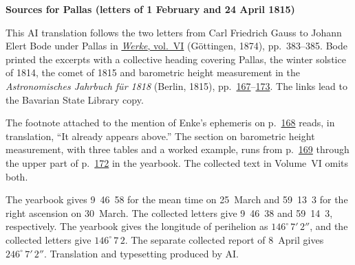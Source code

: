 \clearpage\thispagestyle{empty}
\begin{center}\textbf{Sources for Pallas (letters of 1 February and 24 April 1815)}\end{center}
\noindent This AI translation follows the two letters from Carl Friedrich Gauss to Johann Elert Bode under Pallas in \href{https://gdz.sub.uni-goettingen.de/id/PPN236007467}{\textit{Werke}, vol.~VI} (Göttingen, 1874), pp.~383--385. Bode printed the excerpts with a collective heading covering Pallas, the winter solstice of 1814, the comet of 1815 and barometric height measurement in the \textit{Astronomisches Jahrbuch für 1818} (Berlin, 1815), pp.~\href{https://api.digitale-sammlungen.de/iiif/image/v2/bsb10538347_00175/full/1600,/0/default.jpg}{167}--\href{https://api.digitale-sammlungen.de/iiif/image/v2/bsb10538347_00181/full/1600,/0/default.jpg}{173}. The links lead to the Bavarian State Library copy.
\par\smallskip\noindent The footnote attached to the mention of Enke’s ephemeris on p.~\href{https://api.digitale-sammlungen.de/iiif/image/v2/bsb10538347_00176/full/1600,/0/default.jpg}{168} reads, in translation, “It already appears above.” The section on barometric height measurement, with three tables and a worked example, runs from p.~\href{https://api.digitale-sammlungen.de/iiif/image/v2/bsb10538347_00177/full/1600,/0/default.jpg}{169} through the upper part of p.~\href{https://api.digitale-sammlungen.de/iiif/image/v2/bsb10538347_00180/full/1600,/0/default.jpg}{172} in the yearbook. The collected text in Volume~VI omits both.
\par\smallskip\noindent The yearbook gives 9~46~58 for the mean time on 25~March and 59~13~3 for the right ascension on 30~March. The collected letters give 9~46~38 and 59~14~3, respectively. The yearbook gives the longitude of perihelion as $146^\circ\,7'\,2''$, and the collected letters give $146^\circ\,7\,2$. The separate collected report of 8~April gives $246^\circ\,7'\,2''$. Translation and typesetting produced by AI.
\clearpage
